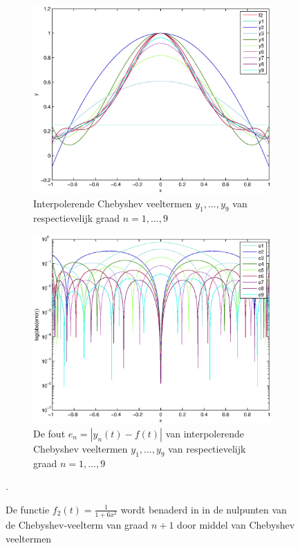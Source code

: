 \documentclass[a4paper]{article}
\begin{document}
\begin{figure}
    \centering
    \begin{subfigure}[t]{\textwidth}
        \centering
        \includegraphics[width=\textwidth]{Jona/cheby_f2_interpolation.eps}
        \caption{Interpolerende Chebyshev veeltermen $y_{1},\dots,y_{9}$ van respectievelijk graad $n=1,\dots,9$}
        \label{fig:cheb_f2_interpol}
    \end{subfigure}
    \begin{subfigure}[t]{\textwidth}
        \centering
        \includegraphics[width=\textwidth]{Jona/cheby_f2_error.eps}
        \caption{De fout $e_{n} = |y_{n}(t)-f(t)|$ van interpolerende Chebyshev veeltermen $y_{1},\dots,y_{9}$ van respectievelijk graad $n=1,\dots,9$}
        \label{fig:cheb_f2_error}
    \end{subfigure}
    \hfill
    \caption{De functie $f_{2}(t) = \frac{1}{1+6x^{2}}$ wordt benaderd in in de nulpunten van de Chebyshev-veelterm van graad $n+1$ door middel van Chebyshev veeltermen}\label{fig:cheb_f2}.
\end{figure}
\end{document}
